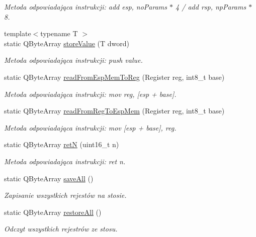 \begin{DoxyCompactItemize}
\begin{DoxyCompactList}\small\item\em Metoda odpowiadająca instrukcji\-: add esp, no\-Params $\ast$ 4 / add rsp, np\-Params $\ast$ 8. \end{DoxyCompactList}\item 
{\footnotesize template$<$typename T $>$ }\\static Q\-Byte\-Array \hyperlink{class_code_defines_a8b8beae6895e7918b82c3c04e365e88d}{store\-Value} (T dword)
\begin{DoxyCompactList}\small\item\em Metoda odpowiadająca instrukcji\-: push value. \end{DoxyCompactList}\item 
static Q\-Byte\-Array \hyperlink{class_code_defines_a43ccdbbc575554bfe34c96d5d14232e5}{read\-From\-Esp\-Mem\-To\-Reg} (Register reg, int8\-\_\-t base)
\begin{DoxyCompactList}\small\item\em Metoda odpowiadająca instrukcji\-: mov reg, \mbox{[}esp + base\mbox{]}. \end{DoxyCompactList}\item 
static Q\-Byte\-Array \hyperlink{class_code_defines_af99c634779d7b27ec72fbd2fe15065c8}{read\-From\-Reg\-To\-Esp\-Mem} (Register reg, int8\-\_\-t base)
\begin{DoxyCompactList}\small\item\em Metoda odpowiadająca instrukcji\-: mov \mbox{[}esp + base\mbox{]}, reg. \end{DoxyCompactList}\item 
static Q\-Byte\-Array \hyperlink{class_code_defines_abff87050d31f5313af2f92f41c5aeba6}{ret\-N} (uint16\-\_\-t n)
\begin{DoxyCompactList}\small\item\em Metoda odpowiadająca instrukcji\-: ret n. \end{DoxyCompactList}\item 
static Q\-Byte\-Array \hyperlink{class_code_defines_ad2904023d0e1e87474da13edb453fb30}{save\-All} ()
\begin{DoxyCompactList}\small\item\em Zapisanie wszystkich rejestów na stosie. \end{DoxyCompactList}\item 
static Q\-Byte\-Array \hyperlink{class_code_defines_ab01a6ea78d9474c3e5d4cbf4414253d1}{restore\-All} ()
\begin{DoxyCompactList}\small\item\em Odczyt wszystkich rejestrów ze stosu. \end{DoxyCompactList}\end{DoxyCompactItemize}
